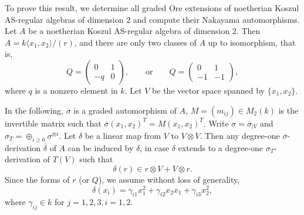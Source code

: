 \documentclass[a4paper,10pt]{amsart}
\theoremstyle{definition}
\numberwithin{equation}{section}
\begin{document}
To prove this result, we determine all graded Ore extensions of noetherian Koszul AS-regular algebras of dimension $2$ and compute their Nakayama automorphisms. Let $A$ be a noetherian Koszul AS-regular algebra of dimension $2$. Then $A=k\langle x_1,x_2\rangle/(r)$, and there are only two classes of $A$ up to isomorphism, that is,
$$
Q=\left(
\begin{array}{cc}
0 & 1\\
-q  &  0
\end{array}
\right),\qquad\text{or}\qquad
Q=\left(
\begin{array}{cc}
0 & 1\\
-1  &  -1
\end{array}
\right),
$$
where $q$ is a nonzero element in $k$. Let $V$ be the vector space spanned by $\{x_1,x_2\}$.

In the following, $\overline{\sigma}$ is a graded automorphism of $A$, $M=(m_{ij})\in M_2(k)$ is the invertible matrix such that $\overline{\sigma}(x_1,x_2)^T=M(x_1,x_2)^T$. Write $\sigma=\overline{\sigma}_{\mid V}$ and $\sigma_T=\oplus_{i\geq0}\sigma^{\otimes i}$. Let $\delta$ be a linear map from $V$ to $V\otimes V$. Then any degree-one $\overline{\sigma}$-derivation $\overline{\delta}$ of $A$ can be induced by $\delta$, in case $\delta$ extends to a degree-one  $\sigma_T$-derivation of $T(V)$ such that
\begin{equation}\label{condtion for comm}
\delta(r)\in r\otimes V+V\otimes r.
\end{equation}
Since the forms of $r$ (or $Q$), we assume without loss of generality,
$$
\delta(x_i)=\gamma_{i1}x_1^2+\gamma_{i2}x_2x_1+\gamma_{i3}x_2^2,
$$
where $\gamma_{ij}\in k$ for $j=1,2,3,i=1,2.$
\end{document}
